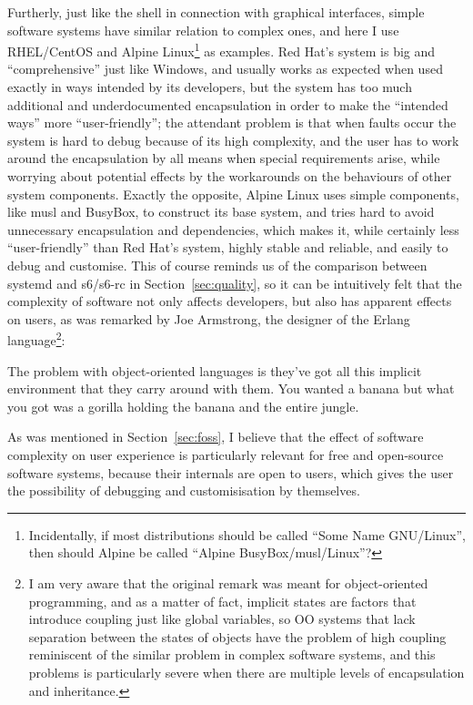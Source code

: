 Furtherly, just like the shell in connection with graphical interfaces,
simple software systems have similar relation to complex ones, and here I
use RHEL/CentOS and Alpine Linux\footnote{Incidentally, if most distributions
should be called ``Some Name GNU/Linux'', then
should Alpine be called ``Alpine BusyBox/musl/Linux''?} as examples.  Red Hat's
system is big and ``comprehensive'' just like Windows, and usually works as
expected when used exactly in ways intended by its developers, but the system
has too much additional and underdocumented encapsulation in order to make the
``intended ways'' more ``user-friendly''; the attendant problem is that when
faults occur the system is hard to debug because of its high complexity, and the
user has to work around the encapsulation by all means when special requirements
arise, while worrying about potential effects by the workarounds on the
behaviours of other system components.  Exactly the
opposite, Alpine Linux uses simple components, like musl and BusyBox, to
construct its base system, and tries hard to avoid unnecessary encapsulation
and dependencies, which makes it, while certainly less ``user-friendly'' than
Red Hat's system, highly stable and reliable, and easily to debug and customise.
This of course reminds us of the comparison between systemd and s6/s6-rc in
Section~\ref{sec:quality}, so it can be intuitively felt that the complexity of
software not only affects developers, but also has apparent effects on users,
as was remarked by Joe Armstrong, the designer of the Erlang language\footnote%
{I am very aware that the original remark was meant for object-oriented
programming, and as a matter of fact, implicit states are factors that
introduce coupling just like global variables, so OO systems that lack
separation between the states of objects have the problem of high
coupling reminiscent of the similar problem in complex software
systems, and this problems is particularly severe when there
are multiple levels of encapsulation and inheritance.}:
\begin{quoting}
	The problem with object-oriented languages is they've got all this implicit
	environment that they carry around with them.  You wanted a banana but
	what you got was a gorilla holding the banana and the entire jungle.
\end{quoting}
As was mentioned in Section~\ref{sec:foss}, I believe that the effect
of software complexity on user experience is particularly relevant
for free and open-source software systems, because their internals
are open to users, which gives the user the possibility
of debugging and customisisation by themselves.

